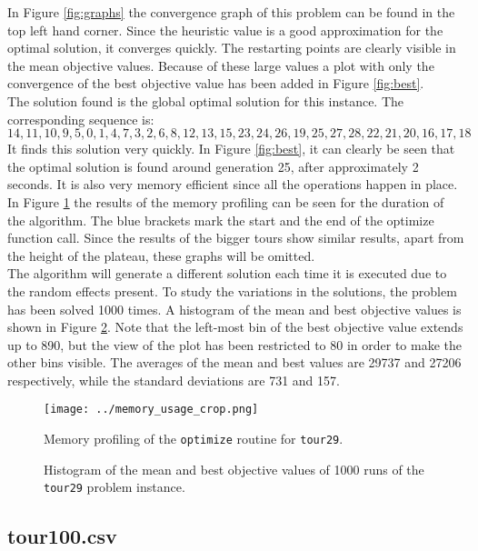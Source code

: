 \documentclass[a4paper,10pt]{article}
\begin{document}
In Figure \ref{fig:graphs} the convergence graph of this problem can be found in the top left hand corner. Since the heuristic value is a good approximation for the optimal solution, it converges quickly. The restarting points are clearly visible in the mean objective values. Because of these large values a plot with only the convergence of the best objective value has been added in Figure \ref{fig:best}.\\
The solution found is the global optimal solution for this instance. The corresponding sequence is:
$$14,11,10,9,5,0,1,4,7,3,2,6,8,12,13,15,23,24,26,19,25,27,28,22,21,20,16,17,18$$
It finds this solution very quickly. In Figure \ref{fig:best}, it can clearly be seen that the optimal solution is found around generation 25, after approximately 2 seconds. It is also very memory efficient since all the operations happen in place. In Figure \ref{fig:memory} the results of the memory profiling can be seen for the duration of the algorithm. The blue brackets mark the start and the end of the optimize function call. Since the results of the bigger tours show similar results, apart from the height of the plateau, these graphs will be omitted.\\
The algorithm will generate a different solution each time it is executed due to the random effects present. To study the variations in the solutions, the problem has been solved 1000 times. A histogram of the mean and best objective values is shown in Figure \ref{fig:histogram}. Note that the left-most bin of the best objective value extends up to 890, but the view of the plot has been restricted to 80 in order to make the other bins visible. The averages of the mean and best values are 29737 and 27206 respectively, while the standard deviations are 731 and 157.

\begin{figure}
\centering
\texttt{[image: ../memory\_usage\_crop.png]}
\caption{Memory profiling of the \texttt{optimize} routine for \texttt{tour29}.}
\label{fig:memory}
\end{figure}

\begin{figure}
\centering
\scalebox{1}{}
\caption{Histogram of the mean and best objective values of 1000 runs of the \texttt{tour29} problem instance.}
\label{fig:histogram}
\end{figure}

\subsection{tour100.csv}
\end{document}
